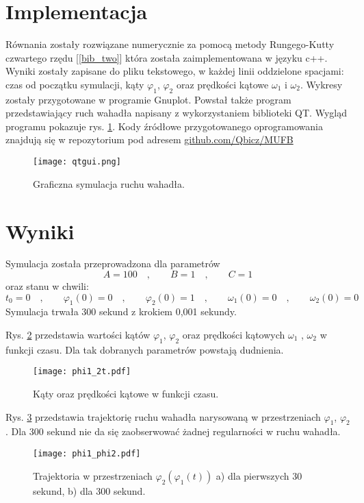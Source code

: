 \documentclass[11pt]{aghdpl}
\begin{document}
\clearpage
\section{Implementacja}
Równania zostały rozwiązane numerycznie za pomocą metody Rungego-Kutty czwartego rzędu [\ref{bib_two}] która została zaimplementowana w języku c++. Wyniki zostały zapisane do pliku tekstowego, w każdej linii oddzielone spacjami: czas od początku symulacji, kąty $\varphi_1$, $\varphi_2$ oraz prędkości kątowe $\omega_1$ i $\omega_2$. Wykresy zostały przygotowane w programie Gnuplot. Powstał także program przedstawiający ruch wahadła napisany z wykorzystaniem biblioteki QT. Wygląd programu pokazuje rys. \ref{QTgui}. Kody źródłowe przygotowanego oprogramowania znajdują się w repozytorium pod adresem \href{http://www.github.com/Qbicz/MUFB}{github.com/Qbicz/MUFB} 
\begin{figure}[h!]
	\centering
	\texttt{[image: qtgui.png]}
	\caption{Graficzna symulacja ruchu wahadła.}
	\label{QTgui}
\end{figure}

\section{Wyniki}
Symulacja została przeprowadzona dla parametrów 
\begin{equation}
	A = 100\quad , \qquad B = 1 \quad , \qquad C = 1
\end{equation} 
oraz stanu w chwili:
\begin{equation} \nonumber
	t_0=0 \quad , \qquad \varphi_1(0) = 0 \quad , \qquad 			\varphi_2(0) = 1 \quad , \qquad \omega_1(0) = 0 \quad , 		\qquad \omega_2(0) = 0
\end{equation}
Symulacja trwała 300 sekund z krokiem 0,001 sekundy.

Rys. \ref{phi1_2odt.} przedstawia wartości kątów $\varphi_1$, $\varphi_2$ oraz prędkości kątowych $\omega_1$ , $\omega_2$ w funkcji czasu. Dla tak dobranych parametrów powstają dudnienia.
\begin{figure}[h!]
	\centering
	\texttt{[image: phi1\_2t.pdf]}
	\caption{Kąty oraz prędkości kątowe w funkcji czasu.}	
	\label{phi1_2odt.}
\end{figure}

Rys. \ref{phi1_phi2} przedstawia trajektorię ruchu wahadła narysowaną w przestrzeniach $\varphi_1$, $\varphi_2$. Dla 300 sekund nie da się zaobserwować żadnej regularności w ruchu wahadła.
\begin{figure}[h!]
	\centering
	\texttt{[image: phi1\_phi2.pdf]}
	\caption{Trajektoria w przestrzeniach $\varphi_2(\varphi_1(t))$ \quad a) dla pierwszych 30 sekund, \quad b) dla 300 sekund.}
	\label{phi1_phi2}
\end{figure}
\end{document}
